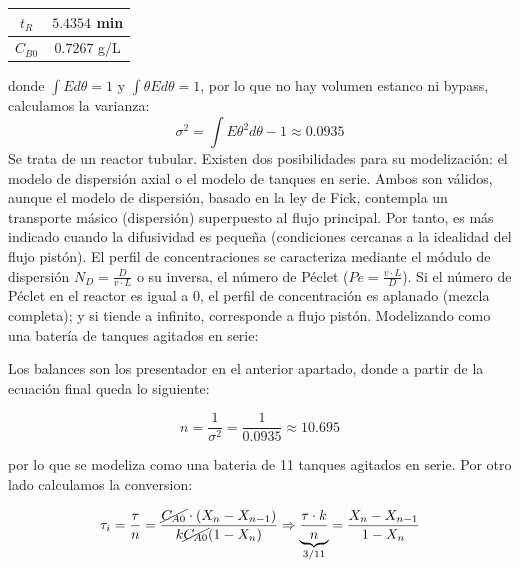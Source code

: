\begin{enumerate}[label={\alph*)}]
\begin{center}
		      \vspace{1.5em}
		      \begin{tabular}{|c|c|}
			      \hline
			      $t_R$    & $5.4354$ min \\ \hline
			      $C_{B0}$ & $0.7267$ g/L \\ \hline
		      \end{tabular}
	      \end{center}
	      \noindent donde $\int E d\theta = 1$ y $ \int \theta E d\theta = 1 $, por lo que no hay volumen estanco ni bypass, calculamos la varianza:
	      \begin{equation*}
		      \sigma^2 = \int E \theta^2 d\theta - 1 \approx 0.0935
	      \end{equation*}
	      \noindent Se trata de un reactor tubular. Existen dos posibilidades para su modelización: el modelo de dispersión axial o el modelo de tanques en serie. Ambos son válidos, aunque el modelo de dispersión, basado en la ley de Fick, contempla un transporte másico (dispersión) superpuesto al flujo principal. Por tanto, es más indicado cuando la difusividad es pequeña (condiciones cercanas a la idealidad del flujo pistón). El perfil de concentraciones se caracteriza mediante el módulo de dispersión $N_D = \frac{D}{v\cdot L}$ o su inversa, el número de Péclet ($Pe = \frac{v\cdot L}{D}$).
	      \noindent Si el número de Péclet en el reactor es igual a 0, el perfil de concentración es aplanado (mezcla completa); y si tiende a infinito, corresponde a flujo pistón. Modelizando como una batería de tanques agitados en serie:


	      \noindent Los balances son los presentador en el anterior apartado, donde a partir de la ecuación final queda lo siguiente:

	      \begin{equation*}
		      n = \frac{1}{\sigma^2} = \frac{1}{0.0935} \approx 10.695
	      \end{equation*}

	      \noindent por lo que se modeliza como una bateria de 11 tanques agitados en serie. Por otro lado calculamos la conversion:

	      \begin{equation*}
		      \tau_i = \frac{\tau}{n} = \frac{\cancel{C_{A0}} \cdot (X_{n} - X_{n-1})}{k \cancel{C_{A0}}(1-X_{n})}\Rightarrow \underbrace{\frac{\tau \cdot k}{n}}_{3/11} = \frac{X_{n}-X_{n-1}}{1-X_{n}}
	      \end{equation*}
	      \begin{center}
	      \end{center}


\end{enumerate}
